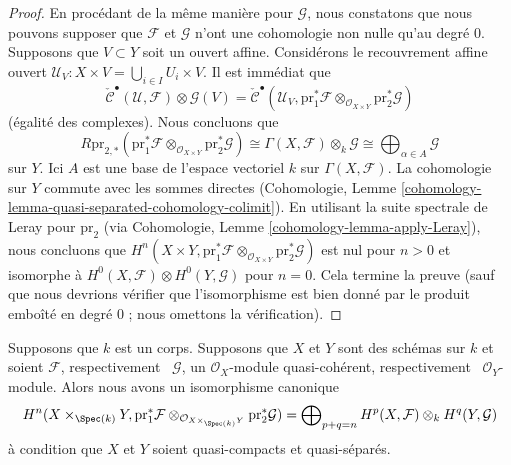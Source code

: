 \begin{proof}
\medskip\noindent
En procédant de la même manière pour $\mathcal{G}$, nous
constatons que nous pouvons supposer que $\mathcal{F}$ et
$\mathcal{G}$ n'ont une cohomologie non nulle qu'au degré
$0$. Supposons que $V \subset Y$ soit un ouvert affine.
Considérons le recouvrement affine ouvert $\mathcal{U}_V : X
\times V = \bigcup_{i \in I} U_i \times V$. Il est immédiat que
$$
\check{\mathcal{C}}^\bullet(\mathcal{U}, \mathcal{F}) \otimes \mathcal{G}(V) =
\check{\mathcal{C}}^\bullet(\mathcal{U}_V,
\text{pr}_1^*\mathcal{F} \otimes_{\mathcal{O}_{X \times Y}}
\text{pr}_2^*\mathcal{G})
$$
(égalité des complexes). Nous concluons que
$$
R\text{pr}_{2, *}(\text{pr}_1^*\mathcal{F} \otimes_{\mathcal{O}_{X \times Y}}
\text{pr}_2^*\mathcal{G})
\cong
\Gamma(X, \mathcal{F}) \otimes_k \mathcal{G} \cong
\bigoplus\nolimits_{\alpha \in A} \mathcal{G}
$$
sur $Y$. Ici $A$ est une base de l’espace vectoriel $k$
sur $\Gamma(X, \mathcal{F})$. La cohomologie sur $Y$
commute avec les sommes directes (Cohomologie, Lemme
\ref{cohomology-lemma-quasi-separated-cohomology-colimit}).
En utilisant la suite spectrale de Leray pour
$\text{pr}_2$ (via Cohomologie, Lemme
\ref{cohomology-lemma-apply-Leray}), nous concluons que
$H^n(X \times Y, \text{pr}_1^*\mathcal{F}
\otimes_{\mathcal{O}_{X \times Y}} \text{pr}_2^*\mathcal{G})$
est nul pour $n > 0$ et isomorphe à $H^0(X, \mathcal{F}) \otimes
H^0(Y, \mathcal{G})$ pour $n = 0$. Cela termine la preuve (sauf
que nous devrions vérifier que l’isomorphisme est bien donné par
le produit emboîté en degré $0$ ; nous omettons la vérification).
\end{proof}

\begin{lemma}
\label{lemma-kunneth-general}
Supposons que $k$ est un corps. Supposons que $X$ et $Y$ sont des
schémas sur $k$ et soient $\mathcal{F}$, respectivement \
$\mathcal{G}$, un $\mathcal{O}_X$-module quasi-cohérent,
respectivement \ $\mathcal{O}_Y$-module. Alors nous avons un isomorphisme canonique
$$
H^n(X \times_{\Spec(k)} Y, \text{pr}_1^*\mathcal{F}
\otimes_{\mathcal{O}_{X \times_{\Spec(k)} Y}} \text{pr}_2^*\mathcal{G}) =
\bigoplus\nolimits_{p + q = n}
H^p(X, \mathcal{F}) \otimes_k H^q(Y, \mathcal{G})
$$
à condition que $X$ et $Y$ soient quasi-compacts et quasi-séparés.
\end{lemma}

